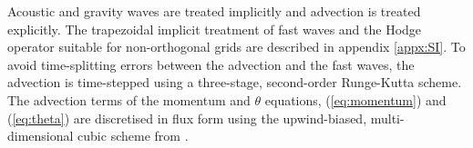 Acoustic and gravity waves are treated implicitly and advection is treated explicitly. The trapezoidal implicit treatment of fast waves and the Hodge operator suitable for non-orthogonal grids are described in appendix \ref{appx:SI}. To avoid time-splitting errors between the advection and the fast waves, the advection is time-stepped using a three-stage, second-order Runge-Kutta scheme. The advection terms of the momentum and $\theta$ equations, (\ref{eq:momentum}) and (\ref{eq:theta}) are discretised in flux form using the upwind-biased, multi-dimensional cubic scheme from \citet{weller-shahrokhi2014}.


